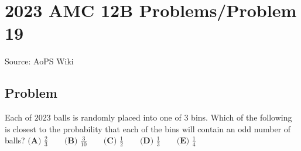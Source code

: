 \documentclass[12pt]{article}
\begin{document}
\section*{{2023 AMC 12B Problems/Problem 19}}
Source: AoPS Wiki

\subsection*{Problem}
Each of $2023$ balls is randomly placed into one of $3$ bins. Which of the following is closest to the probability that each of the bins will contain an odd number of balls? $\textbf{(A) } \frac{2}{3} \qquad\textbf{(B) } \frac{3}{10} \qquad\textbf{(C) } \frac{1}{2} \qquad\textbf{(D) } \frac{1}{3} \qquad\textbf{(E) } \frac{1}{4}$
\end{document}
